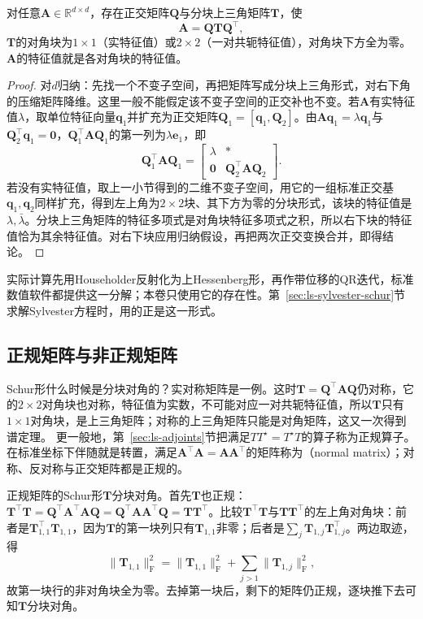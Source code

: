 \begin{theorem}[实Schur形]
\label{thm:ls-real-schur}
对任意$\bm A\in\mathbb R^{d\times d}$，存在正交矩阵$\bm Q$与分块上三角矩阵$\bm T$，使
\begin{equation}
 \bm A=\bm Q\bm T\bm Q^{\top},
 \label{eq:matrix-analysis-schur-decomposition}
\end{equation}
$\bm T$的对角块为$1\times1$（实特征值）或$2\times2$（一对共轭特征值），对角块下方全为零。$\bm A$的特征值就是各对角块的特征值。
\end{theorem}
\begin{proof}
对$d$归纳：先找一个不变子空间，再把矩阵写成分块上三角形式，对右下角的压缩矩阵降维。这里一般不能假定该不变子空间的正交补也不变。若$\bm A$有实特征值$\lambda$，取单位特征向量$\bm q_1$并扩充为正交矩阵$\bm Q_1=[\bm q_1,\bm Q_2]$。由$\bm A\bm q_1=\lambda\bm q_1$与$\bm Q_2^\top\bm q_1=\bm0$，$\bm Q_1^\top\bm A\bm Q_1$的第一列为$\lambda\bm e_1$，即
\[
 \bm Q_1^\top\bm A\bm Q_1=\begin{bmatrix}\lambda&*\\\bm0&\bm Q_2^\top\bm A\bm Q_2\end{bmatrix}.
\]
若没有实特征值，取上一小节得到的二维不变子空间，用它的一组标准正交基$\bm q_1,\bm q_2$同样扩充，得到左上角为$2\times2$块、其下方为零的分块形式，该块的特征值是$\lambda,\bar\lambda$。分块上三角矩阵的特征多项式是对角块特征多项式之积，所以右下块的特征值恰为其余特征值。对右下块应用归纳假设，再把两次正交变换合并，即得结论。
\end{proof}
实际计算先用Householder反射化为上Hessenberg形，再作带位移的QR迭代，标准数值软件都提供这一分解；本卷只使用它的存在性。第~\ref{sec:ls-sylvester-schur}节求解Sylvester方程时，用的正是这一形式。

\subsection{正规矩阵与非正规矩阵}

Schur形什么时候是分块对角的？实对称矩阵是一例。这时$\bm T=\bm Q^\top\bm A\bm Q$仍对称，它的$2\times2$对角块也对称，特征值为实数，不可能对应一对共轭特征值，所以$\bm T$只有$1\times1$对角块，是上三角矩阵；对称的上三角矩阵只能是对角矩阵，这又一次得到谱定理。
更一般地，第~\ref{sec:ls-adjoints}节把满足$TT^\star=T^\star T$的算子称为正规算子。在标准坐标下伴随就是转置，满足$\bm A^\top\bm A=\bm A\bm A^\top$的矩阵称为（normal matrix）；对称、反对称与正交矩阵都是正规的。

正规矩阵的Schur形$\bm T$分块对角。首先$\bm T$也正规：$\bm T^\top\bm T=\bm Q^\top\bm A^\top\bm A\bm Q=\bm Q^\top\bm A\bm A^\top\bm Q=\bm T\bm T^\top$。比较$\bm T^\top\bm T$与$\bm T\bm T^\top$的左上角对角块：前者是$\bm T_{1,1}^\top\bm T_{1,1}$，因为$\bm T$的第一块列只有$\bm T_{1,1}$非零；后者是$\sum_j\bm T_{1,j}\bm T_{1,j}^\top$。两边取迹，得
\[
 \lVert\bm T_{1,1}\rVert_{\mathrm F}^2=\lVert\bm T_{1,1}\rVert_{\mathrm F}^2+\sum_{j>1}\lVert\bm T_{1,j}\rVert_{\mathrm F}^2 ,
\]
故第一块行的非对角块全为零。去掉第一块后，剩下的矩阵仍正规，逐块推下去可知$\bm T$分块对角。

